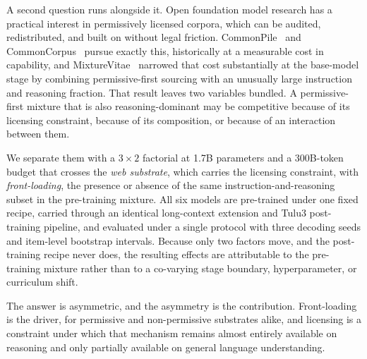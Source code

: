 \documentclass{article}
\begin{document}
A second question runs alongside it. Open foundation model research has a practical interest in permissively licensed corpora, which can be audited, redistributed, and built on without legal friction. CommonPile~\citep{kandpal2025commonpilev018tb_arxiv} and CommonCorpus~\citep{langlais2025commoncorpus} pursue exactly this, historically at a measurable cost in capability, and MixtureVitae~\citep{nguyen2025mixturevitae_arxiv} narrowed that cost substantially at the base-model stage by combining permissive-first sourcing with an unusually large instruction and reasoning fraction. That result leaves two variables bundled. A permissive-first mixture that is also reasoning-dominant may be competitive because of its licensing constraint, because of its composition, or because of an interaction between them.

We separate them with a $3 \times 2$ factorial at 1.7B parameters and a 300B-token budget that crosses the \emph{web substrate}, which carries the licensing constraint, with \emph{front-loading}, the presence or absence of the same instruction-and-reasoning subset in the pre-training mixture. All six models are pre-trained under one fixed recipe, carried through an identical long-context extension and Tulu3 post-training pipeline, and evaluated under a single protocol with three decoding seeds and item-level bootstrap intervals. Because only two factors move, and the post-training recipe never does, the resulting effects are attributable to the pre-training mixture rather than to a co-varying stage boundary, hyperparameter, or curriculum shift.

The answer is asymmetric, and the asymmetry is the contribution. Front-loading is the driver, for permissive and non-permissive substrates alike, and licensing is a constraint under which that mechanism remains almost entirely available on reasoning and only partially available on general language understanding.
\end{document}
